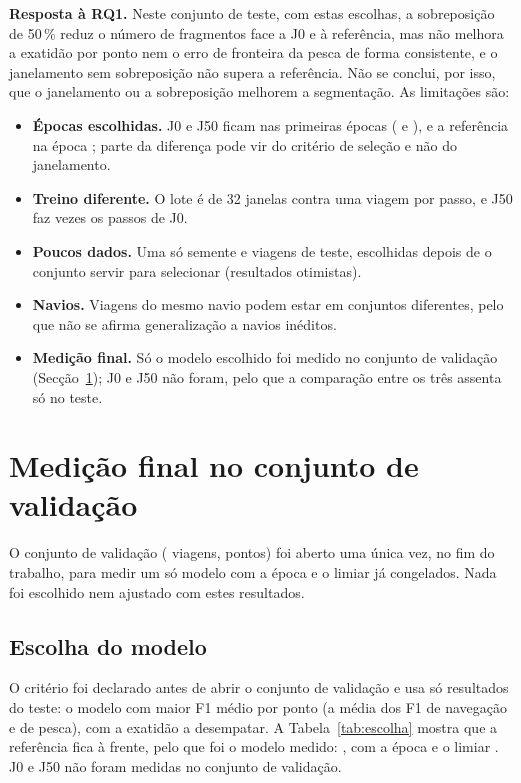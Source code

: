 \documentclass{article}
\newcommand{\revtext}[2]{{\color{#1}#2}}
\begin{document}
\revtext{rev052}{\textbf{Resposta à RQ1.} Neste conjunto de teste, com estas escolhas, a sobreposição de 50\,\% reduz o número de fragmentos face a J0 e à referência, mas não melhora a exatidão por ponto nem o erro de fronteira da pesca de forma consistente, e o janelamento sem sobreposição não supera a referência. Não se conclui, por isso, que o janelamento ou a sobreposição melhorem a segmentação. As limitações são:
\begin{itemize}
\item \textbf{Épocas escolhidas.} J0 e J50 ficam nas primeiras épocas (\resJZEpoca{} e \resJCEpoca{}), e a referência na época \resBsEpoca{}; parte da diferença pode vir do critério de seleção e não do janelamento.
\item \textbf{Treino diferente.} O lote é de 32 janelas contra uma viagem por passo, e J50 faz \resJCPassosVezes{} vezes os passos de J0.
\item \textbf{Poucos dados.} Uma só semente e \resSelViagens{} viagens de teste, escolhidas depois de o conjunto servir para selecionar (resultados otimistas).
\item \textbf{Navios.} Viagens do mesmo navio podem estar em conjuntos diferentes, pelo que não se afirma generalização a navios inéditos.
\item \textbf{Medição final.} \revtext{rev053}{Só o modelo escolhido foi medido no conjunto de validação (Secção~\ref{sec:validacao}); J0 e J50 não foram, pelo que a comparação entre os três assenta só no teste.}
\end{itemize}}

\section{\texorpdfstring{\revtext{rev053}{Medição final no conjunto de validação}}{Medição final no conjunto de validação}}
\label{sec:validacao}

\revtext{rev053}{O conjunto de validação (\resVaViagens{} viagens, \resVaPontos{} pontos) foi aberto uma única vez, no fim do trabalho, para medir um só modelo com a época e o limiar já congelados. Nada foi escolhido nem ajustado com estes resultados.}

\subsection{\texorpdfstring{\revtext{rev053}{Escolha do modelo}}{Escolha do modelo}}

\revtext{rev053}{O critério foi declarado antes de abrir o conjunto de validação e usa só resultados do teste: o modelo com maior F1 médio por ponto (a média dos F1 de navegação e de pesca), com a exatidão a desempatar. A Tabela~\ref{tab:escolha} mostra que a referência fica à frente, pelo que foi o modelo medido: \resVaModelo, com a época \resVaEpoca{} e o limiar \resVaLimiar{}. J0 e J50 não foram medidas no conjunto de validação.}
\end{document}
